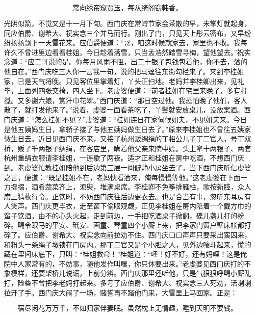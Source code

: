 \[
常向绣帘窥贾玉，每从绮阁窃韩香。
\]

光阴似箭，不觉又是十一月下旬。西门庆在常峙节家会茶散的早，未掌灯就起身，同应伯爵、谢希大、祝实念三个并马而行。刚出了门，只见天上彤云密布，又早纷纷扬扬飘下一天雪花来。应伯爵便道：“哥，咱这时候就家去，家里也不收。我每许久不曾进里边看看桂姐，今日趁着落雪，只当孟浩然踏雪寻梅，望他望去。”祝实念道：“应二哥说的是。你每月风雨不阻，出二十银子包钱包着他，你不去，落的他自在。”西门庆吃三人你一言我一句，说的把马迳往东街勾栏来了。来到李桂姐家，已是天气将晚。只见客位里掌着灯，丫头正扫地。老妈并李桂卿出来，见礼毕，上面列四张交椅，四人坐下。老虔婆便道：“前者桂姐在宅里来晚了，多有打搅。又多谢六娘，赏汗巾花翠。”西门庆道：“那日空过他。我恐怕晚了他们，客人散了，就打发他来了。”说着，虔婆一面看茶吃了，丫鬟就安放桌儿，设放案酒。西门庆道：“怎么桂姐不见？”虔婆道：“桂姐连日在家伺候姐夫，不见姐夫来。今日是他五姨妈生日，拿轿子接了与他五姨妈做生日去了。”原来李桂姐也不曾往五姨家做生日去。近日见西门庆不来，又接了杭州贩绸绢的丁相公儿子丁二官人，号丁双桥，贩了千两银子绸绢，在客店里，瞒着他父亲来院中嫖。头上拿十两银子、两套杭州重绢衣服请李桂姐，一连歇了两夜。适才正和桂姐在房中吃酒，不想西门庆到。老虔婆忙教桂姐陪他到后边第三层一间僻静小房坐去了。当下西门庆听信虔婆之言，便道：“既是桂姐不在，老妈快看酒来，俺每慢慢等他。”这老虔婆在下面一力撺掇，酒肴蔬菜齐上，须臾，堆满桌席。李桂卿不免筝排雁柱，歌按新腔，众人席上猜枚行令。正饮时，不妨西门庆往后边更衣去。也是合当有事，忽听东耳房有人笑声。西门庆更毕衣，走至窗下偷眼观觑，正见李桂姐在房内陪着一个戴方巾的蛮子饮酒。由不的心头火起，走到前边，一手把吃酒桌子掀翻，碟儿盏儿打的粉碎。喝令跟马的平安、玳安、画童、琴童四个小厮上来，把李家门窗户壁床帐都打碎了。应伯爵、谢希大、祝实念向前拉劝不住。西门庆口口声声只要采出蛮囚来，和粉头一条绳子墩锁在门房内。那丁二官又是个小胆之人，见外边嚷斗起来，慌的藏在里间床底下，只叫：“桂姐救命！”桂姐道：“呸！好不好，还有妈哩！这是俺院中人家常有的，不妨事，随他发作叫嚷，你只休要出来。”老虔婆见西门庆打的不象模样，还要架桥儿说谎，上前分辨。西门庆那里还听他，只是气狠狠呼喝小厮乱打，险些不曾把李老妈打起来。多亏了应伯爵、谢希大、祝实念三人死劝，活喇喇拉开了手。西门庆大闹了一场，赌誓再不踏他门来，大雪里上马回家。正是：

\[
宿尽闲花万万千，不如归家伴妻眠。
虽然枕上无情趣，睡到天明不要钱。
\]
